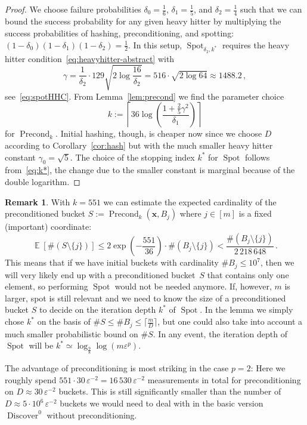 \documentclass[12pt]{article}
\theoremstyle{plain}
\theoremstyle{definition}
\newtheorem{remark}[theorem]{Remark}
\newcommand{\expect}{\operatorname{\mathbb{E}}}
\newcommand{\eps}{\varepsilon}
\renewcommand{\vec}{\boldsymbol}
\DeclareMathOperator{\precond}{Precond}
\DeclareMathOperator{\spot}{Spot}
\DeclareMathOperator{\discover}{Discover} %
\begin{document}
\begin{proof}
    We choose failure probabilities $\delta_0 = \frac16$, $\delta_1 = \frac15$, and $\delta_2 = \frac14$ such that we can bound the success probability for any given heavy hitter by multiplying the success probabilities of hashing, preconditioning, and spotting:
    $(1-\delta_0)(1-\delta_1)(1-\delta_2) = \frac12$.
    In this setup, $\spot_{\delta_2,k^\ast}$ requires the heavy hitter condition~\eqref{eq:heavyhitter-abstract} with
    \begin{equation*}
        \gamma = \frac{1}{\delta_2} \cdot 129 \sqrt{2 \log \frac{16}{\delta_2}}
            = 516 \cdot \sqrt{2\log 64}
            \approx 1488.2 \,,
    \end{equation*}
    see~\eqref{eq:spotHHC}.
    From Lemma~\ref{lem:precond} we find the parameter choice
    \begin{equation*}
        k := \left\lceil 36 \log \left(\frac{1+\frac{2}{5} \gamma^2}{\delta_1}\right)
                \right\rceil
    \end{equation*}
    for $\precond_k$.
    Initial hashing, though, is cheaper now 
    since we choose $D$ according to Corollary~\ref{cor:hash} but with the much smaller heavy hitter constant $\gamma_0 = \sqrt{5}$.
    The choice of the stopping index $k^\ast$ for $\spot$ follows from~\eqref{eq:k*},
    the change due to the smaller constant is marginal because of the double logarithm.
\end{proof}

\begin{remark}
    With $k = 551$ we can estimate the expected cardinality of the preconditioned bucket 
    $S := \precond_k(\vec{x},B_j)$ where $j \in [m]$ is a fixed (important) coordinate:
    \begin{equation*}
        \expect [\#(S \setminus\{j\})]
            \leq 2 \exp\left(-\frac{551}{36}\right) \cdot \#(B_j\setminus\{j\})
            < \frac{\#(B_j\setminus\{j\})}{2\,218\,648} \,.
    \end{equation*}
    This means that if we have initial buckets with cardinality $\# B_j \leq 10^7$, then we will very likely end up with a preconditioned bucket~$S$ that contains only one element, so performing $\spot$ would not be needed anymore.
    If, however, $m$ is larger, spot is still relevant and we need to know the size of a preconditioned bucket $S$ to decide on the iteration depth $k^\ast$ of $\spot$.
    In the lemma we simply chose $k^\ast$ on the basis of $\# S \leq \#B_j \leq \lceil \frac{m}{D} \rceil$, but one could also take into account a much smaller probabilistic bound on $\# S$.
    In any event, the iteration depth of $\spot$ will be 
    $k^\ast \simeq \log_{\frac{9}{8}} \log (m\eps^{p})$.
    
    The advantage of preconditioning is most striking in the case $p = 2$:
    Here we roughly spend
    $551 \cdot 30 \, \eps^{-2} = 16\,530 \, \eps^{-2}$
    measurements in total
    for preconditioning on $D \approx 30\, \eps^{-2}$ buckets.
    This is still significantly smaller than the number of $D \approx 5 \cdot 10^6 \, \eps^{-2}$ buckets we would need to deal with in the basic version $\discover^0$
    without preconditioning.
\end{remark}
\end{document}
